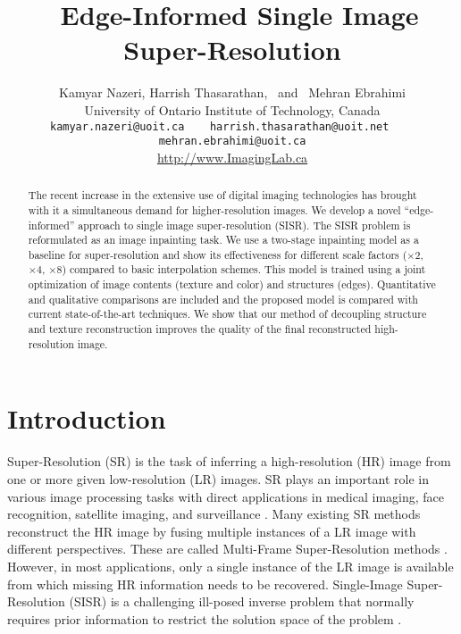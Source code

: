 \documentclass[10pt,twocolumn,letterpaper]{article}
\begin{document}
\title{\ Edge-Informed Single Image Super-Resolution}

\author{Kamyar Nazeri, Harrish Thasarathan, ~and~ Mehran Ebrahimi\\
University of Ontario Institute of Technology, Canada\\
{\tt\small {kamyar.nazeri@uoit.ca~~~ harrish.thasarathan@uoit.net  ~~~  mehran.ebrahimi}@uoit.ca}\\
\small{\url{http://www.ImagingLab.ca}}
}

\maketitle
\ificcvfinal\thispagestyle{empty}\fi

\begin{abstract}

The recent increase in the extensive use of digital imaging technologies has brought with it a simultaneous demand for higher-resolution images. We develop a novel ``edge-informed'' approach to single image super-resolution (SISR).  The SISR problem is reformulated as an image inpainting task. We use a two-stage inpainting model as a baseline for super-resolution and show its effectiveness for different scale factors ($\times 2$, $\times 4$, $\times 8$) compared to basic interpolation schemes. This model is trained using a joint optimization of image contents (texture and color) and structures (edges). Quantitative and qualitative comparisons are included and the proposed model is compared with current state-of-the-art techniques. We show that our method of decoupling structure and texture reconstruction improves the quality of the final reconstructed high-resolution image.
\end{abstract}

\section{Introduction}

Super-Resolution (SR) is the task of inferring a high-resolution (HR) image from one or more given low-resolution (LR) images. SR plays an important role in various image processing tasks with direct applications in medical imaging, face recognition, satellite imaging, and surveillance \cite{farsiu2004advances}. Many existing SR methods reconstruct the HR image by fusing multiple instances of a LR image with different perspectives. These are called Multi-Frame Super-Resolution methods \cite{farsiu2004fast}. However, in most applications, only a single instance of the LR image is available from which missing HR information needs to be recovered.  Single-Image Super-Resolution (SISR) is a challenging ill-posed inverse problem \cite{ebrahimi2007solving} that normally requires prior information  to restrict the solution space of the problem \cite{shi2016real}.
\end{document}
